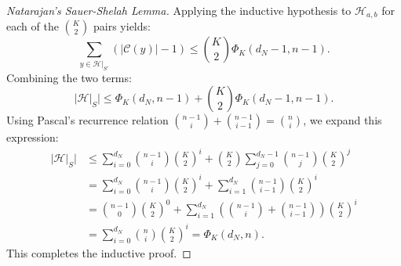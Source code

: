 \begin{proof}[Natarajan's Sauer-Shelah Lemma]
Applying the inductive hypothesis to $\mathcal{H}_{a,b}$ for each of the $\binom{K}{2}$ pairs yields:
\begin{equation}
    \sum_{y \in \mathcal{H}|_{S'}} (|\mathcal{C}(y)| - 1) \le \binom{K}{2} \Phi_K(d_N - 1, n - 1).
\end{equation}
Combining the two terms:
\begin{equation}
    |\mathcal{H}|_S| \le \Phi_K(d_N, n - 1) + \binom{K}{2}\Phi_K(d_N - 1, n - 1).
\end{equation}
Using Pascal's recurrence relation $\binom{n-1}{i} + \binom{n-1}{i-1} = \binom{n}{i}$, we expand this expression:
\begin{align}
    |\mathcal{H}|_S| &\le \sum_{i=0}^{d_N} \binom{n-1}{i} \binom{K}{2}^i + \binom{K}{2}\sum_{j=0}^{d_N-1} \binom{n-1}{j}\binom{K}{2}^j \nonumber \\
    &= \sum_{i=0}^{d_N} \binom{n-1}{i} \binom{K}{2}^i + \sum_{i=1}^{d_N} \binom{n-1}{i-1}\binom{K}{2}^i \nonumber \\
    &= \binom{n-1}{0}\binom{K}{2}^0 + \sum_{i=1}^{d_N} \left( \binom{n-1}{i} + \binom{n-1}{i-1} \right) \binom{K}{2}^i \nonumber \\
    &= \sum_{i=0}^{d_N} \binom{n}{i} \binom{K}{2}^i = \Phi_K(d_N, n).
\end{align}
This completes the inductive proof.
\end{proof}

